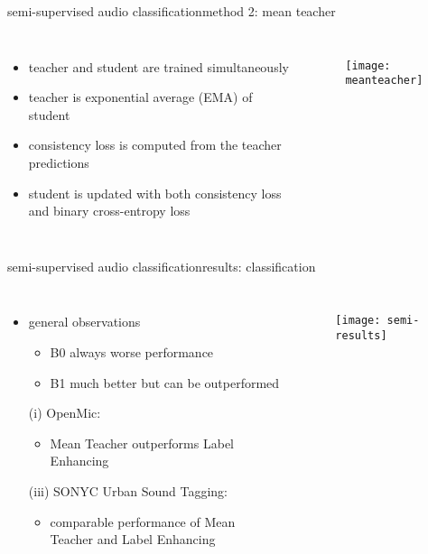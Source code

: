 \begin{frame}{semi-supervised audio classification}{method 2: mean teacher}
    \begin{columns}
            \begin{itemize}
                \item   teacher and student are trained simultaneously
                \bigskip
                \item   teacher is exponential average (EMA) of student
                \bigskip
                \item   consistency loss is computed from the teacher predictions
                \bigskip
                \item   student is updated with both consistency loss and binary cross-entropy loss
            \end{itemize}
            \begin{figure}%
                \texttt{[image: meanteacher]}%
            \end{figure}
    \end{columns}
\end{frame}

\begin{frame}{semi-supervised audio classification}{results: classification}
    \vspace{-5mm}
    \begin{columns}
            \begin{itemize}
                \item   general observations
                    \begin{itemize}
                        \item B0 always worse performance
                        \item B1 much better but can be outperformed
                    \end{itemize}
                \bigskip
                \item[  (i)]   OpenMic:
                    \begin{itemize}
                        \item   Mean Teacher outperforms Label Enhancing
                    \end{itemize}
                \bigskip
                \item[(iii)]   SONYC Urban Sound Tagging:
                    \begin{itemize}
                        \item   comparable performance of Mean Teacher and Label Enhancing
                    \end{itemize}
            \end{itemize}
            \begin{figure}%
                \texttt{[image: semi-results]}%
            \end{figure}
    \end{columns}
\end{frame}

